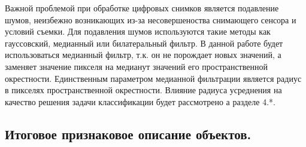 \documentclass[12pt]{article}
\begin{document}
Важной проблемой при обработке цифровых снимков является подавление шумов,
неизбежно возникающих из-за несовершеноства снимающего сенсора и условий съемки.
Для подавления шумов используются такие методы как гауссовский, медианный или билатеральный
фильтр. В данной работе будет использоваться медианный фильтр, т.к. он не порождает новых значений,
а заменяет значение пикселя на медианут значений его пространственной окрестности.
Единственным параметром медианной фильтрации является радиус в пикселях пространственной
окрестности. Влияние радиуса усреднения на качество решения задачи классификации будет рассмотрено
а разделе {\color{red} 4.*}.

\subsection{Итоговое признаковое описание объектов.}
\end{document}

